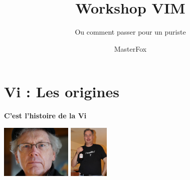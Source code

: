 \documentclass[10pt]{beamer}
\title{Workshop VIM}
\subtitle{Ou comment passer pour un puriste}
\author{MasterFox}
\begin{document}
\maketitle

\section{Vi : Les origines}
\begin{frame}{\textbf{C'est l'histoire de la Vi}}

	\center
	\includegraphics[height=96]{img/bill-joy.jpeg}
	\includegraphics[height=96]{img/bram-moolenaar.jpg}


\end{frame}
\end{document}
